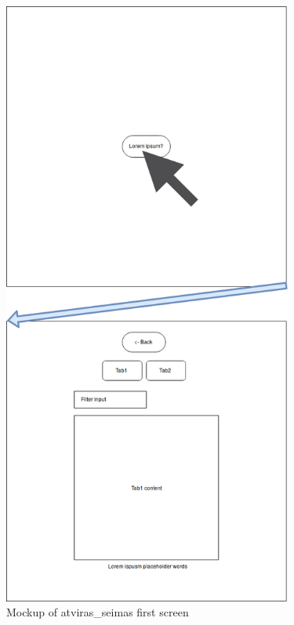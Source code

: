 \documentclass[a4paper,12pt]{article}
\begin{document}
	\begin{figure}[H]	
		\centering
		\includegraphics[width=9.5cm]{images/frontend_mockup_crop_1.png}
		\caption{Mockup of \gls{atviras_seimas} first screen}
		\label{fig:frontend_mockup}
	\end{figure}
	
\end{document}
